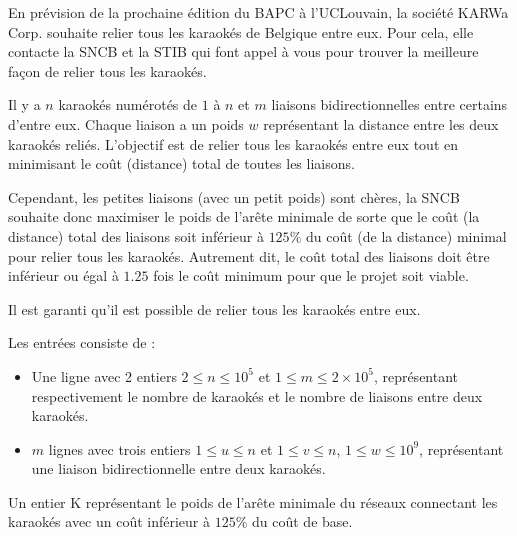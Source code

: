 \problemname{\problemyamlname}


En prévision de la prochaine édition du BAPC à l'UCLouvain, la société KARWa Corp. souhaite relier tous les karaokés de Belgique entre eux.
Pour cela, elle contacte la SNCB et la STIB qui font appel à vous pour trouver la meilleure façon de relier tous les karaokés.

Il y a $n$ karaokés numérotés de $1$ à $n$ et $m$ liaisons bidirectionnelles entre certains d'entre eux.
Chaque liaison a un poids $w$ représentant la distance entre les deux karaokés reliés.
L'objectif est de relier tous les karaokés entre eux tout en minimisant le coût (distance) total de toutes les liaisons.

Cependant, les petites liaisons (avec un petit poids) sont chères, la SNCB souhaite donc maximiser le poids de l'arête minimale de sorte que le coût (la distance) total des liaisons soit inférieur à $125\%$ du coût (de la distance) minimal pour relier tous les karaokés.
Autrement dit, le coût total des liaisons doit être inférieur ou égal à $1.25$ fois le coût minimum pour que le projet soit viable.

Il est garanti qu'il est possible de relier tous les karaokés entre eux.

\begin{Input}
	Les entrées consiste de :
	\begin{itemize}
		\item Une ligne avec 2 entiers $2 \le n \le 10^5$ et $1 \le m \le 2 \times 10^5$, représentant respectivement le nombre de karaokés et le nombre de liaisons entre deux karaokés.
		\item $m$ lignes avec trois entiers  $1 \le u \le n$ et $1 \le v \le n$, $1 \le w \le 10^9$, représentant une liaison bidirectionnelle entre deux karaokés.
	\end{itemize}
\end{Input}

\begin{Output}
	Un entier K représentant le poids de l'arête minimale du réseaux connectant les karaokés avec un coût inférieur à $125\%$ du coût de base.
\end{Output}
